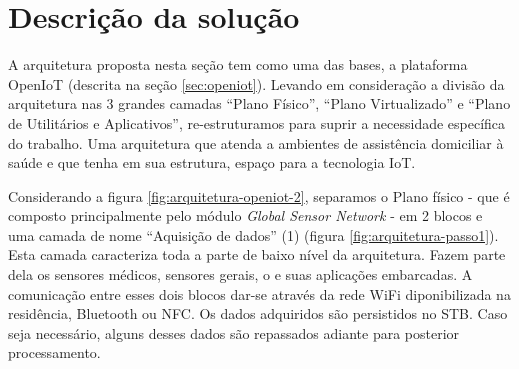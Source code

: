 



\section{Descrição da solução}
\label{sec:descricao-solucao}

A arquitetura proposta nesta seção tem como uma das bases, a plataforma OpenIoT
(descrita na seção \vref{sec:openiot}). Levando em consideração a divisão da
arquitetura nas 3 grandes camadas ``Plano Físico'', ``Plano Virtualizado'' e
``Plano de Utilitários e Aplicativos'', re-estruturamos para suprir a
necessidade específica do trabalho. Uma arquitetura que atenda a ambientes de
assistência domiciliar à saúde e que tenha em sua estrutura, espaço para a
tecnologia IoT.

Considerando a figura \ref{fig:arquitetura-openiot-2}, separamos o Plano físico -
que é composto principalmente pelo módulo \textit{Global Sensor Network} -
em 2 blocos e uma camada de nome ``Aquisição de dados'' (1) (figura
\ref{fig:arquitetura-passo1}). Esta camada caracteriza toda a parte de baixo
nível da arquitetura. Fazem parte dela os sensores médicos, sensores gerais, o
\stb[] e suas aplicações embarcadas. A comunicação entre esses dois blocos
dar-se através da rede WiFi diponibilizada na residência, Bluetooth ou NFC. Os
dados adquiridos são persistidos no STB. Caso seja necessário, alguns desses
dados são repassados adiante para posterior processamento. 

